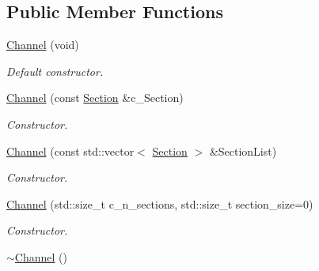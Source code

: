 \subsection*{Public Member Functions}
\begin{DoxyCompactItemize}
\item 
\hypertarget{classChannel_a130abb5b562e98a8c700026f6e328118}{
\hyperlink{classChannel_a130abb5b562e98a8c700026f6e328118}{Channel} (void)}
\label{classChannel_a130abb5b562e98a8c700026f6e328118}

\begin{DoxyCompactList}\small\item\em Default constructor. \item\end{DoxyCompactList}\item 
\hyperlink{classChannel_ad23e275f306c9044089dc1785f75ae52}{Channel} (const \hyperlink{classSection}{Section} \&c\_\-Section)
\begin{DoxyCompactList}\small\item\em Constructor. \item\end{DoxyCompactList}\item 
\hyperlink{classChannel_ab8404b525bf98a610dca014613ed85f2}{Channel} (const std::vector$<$ \hyperlink{classSection}{Section} $>$ \&SectionList)
\begin{DoxyCompactList}\small\item\em Constructor. \item\end{DoxyCompactList}\item 
\hyperlink{classChannel_acdf766293ad403862cbe57693b088b0d}{Channel} (std::size\_\-t c\_\-n\_\-sections, std::size\_\-t section\_\-size=0)
\begin{DoxyCompactList}\small\item\em Constructor. \item\end{DoxyCompactList}\item 
\hypertarget{classChannel_a5f15ebd302464069f1a9e3f0ded14482}{
\hyperlink{classChannel_a5f15ebd302464069f1a9e3f0ded14482}{$\sim$Channel} ()}
\label{classChannel_a5f15ebd302464069f1a9e3f0ded14482}


\end{DoxyCompactItemize}
